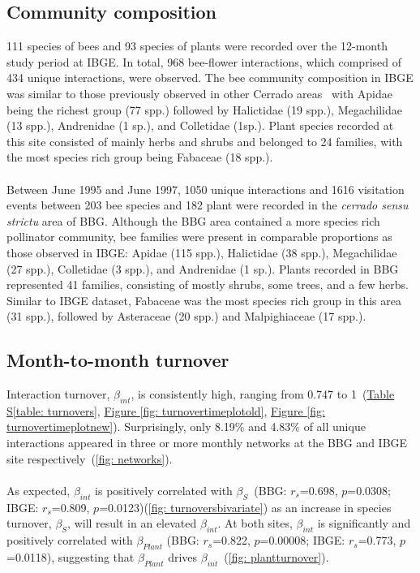 \documentclass[11pt]{article}
\begin{document}
\subsection{Community composition}
111 species of bees and 93 species of plants were recorded over the 12-month study period at IBGE. In total, 968 bee-flower interactions, which comprised of 434 unique interactions, were observed. The bee community composition in IBGE was similar to those previously observed in other Cerrado areas~\citep{Silveira1995, Pinheiro-Machado2002} with Apidae being the richest group (77 spp.) followed by Halictidae (19 spp.), Megachilidae (13 spp.), Andrenidae (1 sp.), and Colletidae (1sp.). Plant species recorded at this site consisted of mainly herbs and shrubs and belonged to 24 families, with the most species rich group being Fabaceae (18 spp.). \\
\\
Between June 1995 and June 1997, 1050 unique interactions and 1616 visitation events between 203 bee species and 182 plant were recorded in the \textit{cerrado sensu strictu} area of BBG. Although the BBG area contained a more species rich pollinator community, bee families were present in comparable proportions as those observed in IBGE: Apidae (115 spp.), Halictidae (38 spp.), Megachilidae (27 spp.), Colletidae (3 spp.), and Andrenidae (1 sp.). Plants recorded in BBG represented 41 families, consisting of mostly shrubs, some trees, and a few herbs. Similar to IBGE dataset, Fabaceae was the most species rich group in this area (31 spp.), followed by Asteraceae (20 spp.) and Malpighiaceae (17 spp.). 

\subsection{Month-to-month turnover}
\label{subsec: turnover} 

Interaction turnover, $\beta_{int}$, is consistently high, ranging from 0.747 to 1~(\hyperref[table: turnovers]{Table S\ref{table: turnovers}}, \hyperref[fig: turnovertimeplotold]{Figure \ref{fig: turnovertimeplotold}}, \hyperref[fig: turnovertimeplotnew]{Figure \ref{fig: turnovertimeplotnew}}). Surprisingly, only 8.19\% and 4.83\% of all unique interactions appeared in three or more monthly networks at the BBG and IBGE site respectively~(\autoref{fig: networks}).\\
\\
As expected, $\beta_{int}$ is positively correlated with $\beta_{S}$~(BBG: $r_{s}$=0.698, $p$=0.0308; IBGE: $r_{s}$=0.809, $p$=0.0123)(\autoref{fig: turnoversbivariate}) as an increase in species turnover, $\beta_{S}$, will result in an elevated $\beta_{int}$. At both sites, $\beta_{int}$ is significantly and positively correlated with $\beta_{Plant}$ (BBG: $r_{s}$=0.822, $p$=0.00008; IBGE: $r_{s}$=0.773, $p$=0.0118), suggesting that $\beta_{Plant}$ drives $\beta_{int}$~(\autoref{fig: plantturnover}).\\
\end{document}
